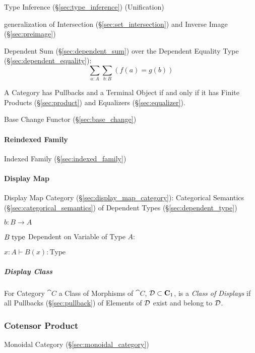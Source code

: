 Type Inference (\S\ref{sec:type_inference}) (Unification)

generalization of Intersection (\S\ref{sec:set_intersection}) and
Inverse Image (\S\ref{sec:preimage})

Dependent Sum (\S\ref{sec:dependent_sum}) over the Dependent Equality
Type (\S\ref{sec:dependent_equality}):
\[
  \sum_{a:A} \sum_{b:B} (f(a) = g(b))
\]

A Category has Pullbacks and a Terminal Object if and only if it has Finite
Products (\S\ref{sec:product}) and Equalizers (\S\ref{sec:equalizer}).
\cite{awodey06}

Base Change Functor (\S\ref{sec:base_change})



\paragraph{Reindexed Family}\label{sec:reindexed_family}\hfill

Indexed Family (\S\ref{sec:indexed_family})



\paragraph{Display Map}\label{sec:display_map}\hfill

Display Map Category (\S\ref{sec:display_map_category}): Categorical
Semantics (\S\ref{sec:categorical_semantics}) of Dependent Types
(\S\ref{sec:dependent_type})

$b : B \rightarrow A$

$B \;\mathrm{type}$ Dependent on Variable of Type $A$:

$x:A \vdash B(x):\mathrm{Type}$



\subparagraph{Display Class}\label{sec:display_class}\hfill

For Category $\cat{C}$ a Class of Morphisms of $\cat{C}$, $\mathcal{D}
\subset \mathbf{C}_1$, is a \emph{Class of Displays} if all Pullbacks
(\S\ref{sec:pullback}) of Elements of $\mathcal{D}$ exist and belong to
$\mathcal{D}$.



\subsubsection{Cotensor Product}\label{sec:cotensor_product}

Monoidal Category (\S\ref{sec:monoidal_category})



